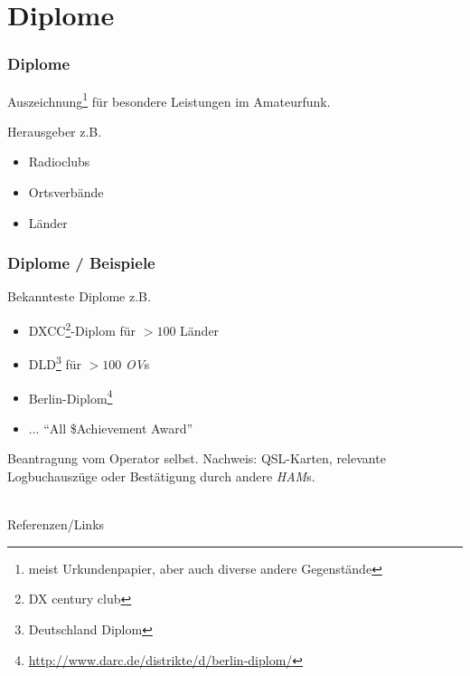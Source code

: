 \section{Diplome}

\begin{frame}
    \frametitle{Diplome}


    Auszeichnung\footnote{meist Urkundenpapier, aber auch diverse andere
    Gegenstände} für besondere Leistungen im Amateurfunk.

    Herausgeber z.B.

    \begin{itemize}
        \item Radioclubs
        \item Ortsverbände
        \item Länder
    \end{itemize}
    
\end{frame}

\begin{frame}
    \frametitle{Diplome / Beispiele}

    Bekannteste Diplome z.B.

    \begin{itemize}
        \item DXCC\footnote{DX century club}-Diplom für $>100$ Länder
        \item DLD\footnote{Deutschland Diplom} für $>100$ \emph{OV}s
		\item Berlin-Diplom\footnote{\url{http://www.darc.de/distrikte/d/berlin-diplom/}}
		\item ... ``All \$Achievement Award''
    \end{itemize}

    Beantragung vom Operator selbst. Nachweis: QSL-Karten, relevante
    Logbuchauszüge oder Bestätigung durch andere \emph{HAM}s.

\end{frame}

\renewcommand{\refname}{Referenzen}

\hypertarget{refs}{}
\textcolor{white}{} \\ %
\Large Referenzen/Links
\footnotesize

